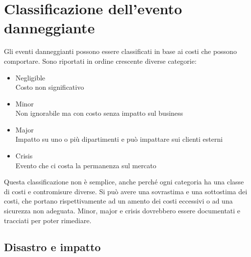 \section{Classificazione dell'evento danneggiante}

Gli eventi danneggianti possono essere classificati in base ai costi
che possono comportare. Sono riportati in ordine crescente diverse categorie:

\begin{itemize}
\item Negligible \\
Costo non significativo
\item Minor \\
Non ignorabile ma con costo senza impatto sul business
\item Major \\
Impatto su uno o più dipartimenti e può impattare sui clienti esterni
\item Crisis \\
Evento che ci costa la permanenza sul mercato
\end{itemize}

Questa classificazione non è semplice, anche perché ogni categoria ha una 
classe di costi e contromisure diverse. Si può avere una sovrastima e una 
sottostima dei costi, che portano rispettivamente ad un amento dei costi 
eccessivi o ad una sicurezza non adeguata.
Minor, major e crisis dovrebbero essere documentati e tracciati per poter 
rimediare.

\subsection{Disastro e impatto}

